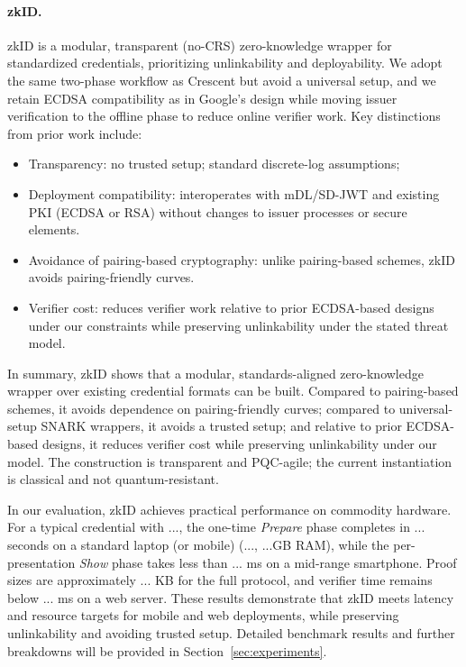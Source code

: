 \paragraph{zkID.}
zkID is a modular, transparent (no-CRS) zero-knowledge wrapper for standardized credentials, prioritizing unlinkability and deployability. We adopt the same two-phase workflow as Crescent but avoid a universal setup, and we retain ECDSA compatibility as in Google’s design while moving issuer verification to the offline phase to reduce online verifier work. Key distinctions from prior work include:
\begin{itemize}
  \item Transparency: no trusted setup; standard discrete-log assumptions; 
  \item Deployment compatibility: interoperates with mDL/SD-JWT and existing PKI (ECDSA or RSA) without changes to issuer processes or secure elements.
  \item Avoidance of pairing-based cryptography: unlike pairing-based schemes, zkID avoids pairing-friendly curves.
  \item Verifier cost: reduces verifier work relative to prior ECDSA-based designs under our constraints while preserving unlinkability under the stated threat model.
\end{itemize}

In summary, zkID shows that a modular, standards-aligned zero-knowledge wrapper over existing credential formats can be built. Compared to pairing-based schemes, it avoids dependence on pairing-friendly curves; compared to universal-setup SNARK wrappers, it avoids a trusted setup; and relative to prior ECDSA-based designs, it reduces verifier cost while preserving unlinkability under our model. The construction is transparent and PQC-agile; the current instantiation is classical and not quantum-resistant.

In our evaluation, zkID achieves practical performance on commodity hardware. For a typical credential with ..., the one-time \emph{Prepare} phase completes in ... seconds on a standard laptop (or mobile) (..., ...GB RAM), while the per-presentation \emph{Show} phase takes less than ... ms on a mid-range smartphone. Proof sizes are approximately ... KB for the full protocol, and verifier time remains below ... ms on a web server. These results demonstrate that zkID meets latency and resource targets for mobile and web deployments, while preserving unlinkability and avoiding trusted setup. Detailed benchmark results and further breakdowns will be provided in Section~\ref{sec:experiments}.